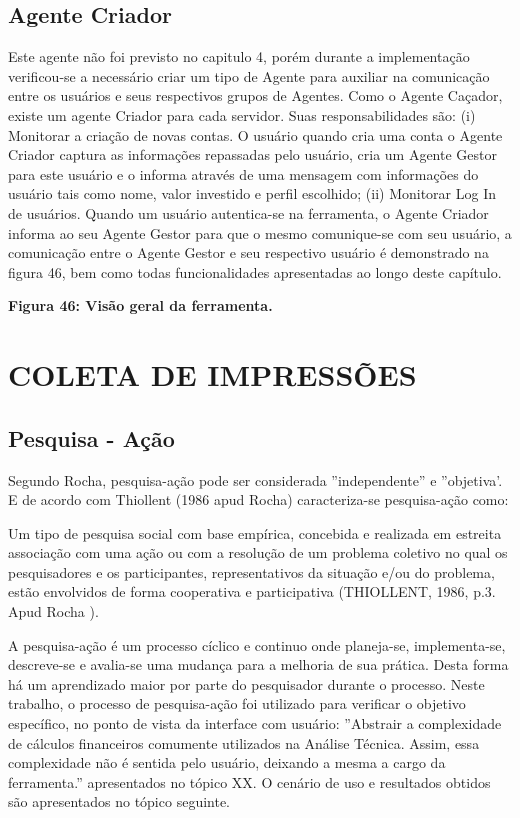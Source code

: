 \subsection{Agente Criador}

Este agente não foi previsto no capitulo 4, porém durante a implementação verificou-se a necessário criar um tipo de Agente para auxiliar na comunicação entre os usuários e seus respectivos grupos de Agentes. Como o Agente Caçador, existe um agente Criador para cada servidor. Suas responsabilidades são: (i) Monitorar a criação de novas contas. O usuário quando cria uma conta o Agente Criador captura as informações repassadas pelo usuário, cria um Agente Gestor para este usuário e o informa através de uma mensagem com informações do usuário tais como nome, valor investido e perfil escolhido; (ii) Monitorar Log In de usuários.  Quando um usuário autentica-se na ferramenta, o Agente Criador informa ao seu Agente Gestor para que o mesmo comunique-se com seu usuário, a comunicação entre o Agente Gestor e seu respectivo usuário é demonstrado na figura 46, bem como todas funcionalidades apresentadas ao longo deste capítulo.

\textbf{Figura 46: Visão geral da ferramenta.}

\section{COLETA DE IMPRESSÕES}
\subsection{Pesquisa - Ação}
Segundo Rocha, pesquisa-ação pode ser considerada ''independente'' e ''objetiva'. E de acordo com Thiollent (1986 apud Rocha) caracteriza-se pesquisa-ação como:
\begin{citacao}
Um tipo de pesquisa social com base empírica, concebida e realizada em estreita associação com uma ação ou com a resolução de um problema coletivo no qual os pesquisadores e os participantes, representativos da situação e/ou do problema, estão envolvidos de forma cooperativa e participativa (THIOLLENT, 1986, p.3. Apud Rocha ).
\end{citacao}

A pesquisa-ação é um processo cíclico e continuo onde planeja-se, implementa-se, descreve-se e avalia-se uma mudança para a melhoria de sua prática. Desta forma há um aprendizado maior por parte do pesquisador durante o processo. Neste trabalho, o processo de pesquisa-ação foi utilizado para verificar o objetivo específico, no ponto de vista da interface com usuário: ''Abstrair a complexidade de cálculos financeiros comumente utilizados na Análise Técnica. Assim, essa complexidade não é sentida pelo usuário, deixando a mesma a cargo da ferramenta.'' apresentados no tópico XX. O cenário de uso e resultados obtidos são apresentados no tópico seguinte.


